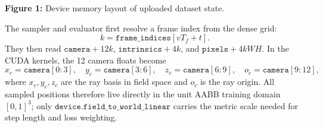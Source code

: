 \begin{center}
{%
    }
    \par\smallskip
    \footnotesize\textbf{Figure 1:} Device memory layout of uploaded dataset state.
    \endgroup
\end{center}

The sampler and evaluator first resolve a frame index from the dense grid:
\[
    k=\texttt{frame\_indices}[vT_f+t].
\]
They then read \(\texttt{camera}+12k\), \(\texttt{intrinsics}+4k\), and \(\texttt{pixels}+4kWH\). In the CUDA kernels, the 12 camera floats become
\[
    x_c=\texttt{camera}[0{:}3],\quad
    y_c=\texttt{camera}[3{:}6],\quad
    z_c=\texttt{camera}[6{:}9],\quad
    o_c=\texttt{camera}[9{:}12],
\]
where \(x_c,y_c,z_c\) are the ray basis in field space and \(o_c\) is the ray origin. All sampled positions therefore live directly in the unit AABB training domain \([0,1]^3\); only \(\texttt{device.field\_to\_world\_linear}\) carries the metric scale needed for step length and loss weighting.
